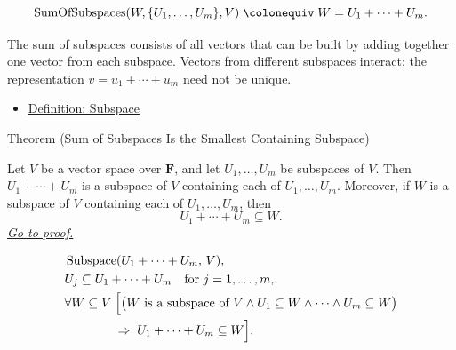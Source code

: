 \begin{remark*}
\[
\operatorname{SumOfSubspaces}(W,\{U_1,\dots,U_m\},V)
\;\colonequiv\;
W=U_1+\cdots+U_m.
\]
\end{remark*}

\begin{remark*}[Interpretation]
The sum of subspaces consists of all vectors that can be built by adding
together one vector from each subspace. Vectors from different subspaces
interact; the representation $v = u_1 + \cdots + u_m$ need not be unique.
\end{remark*}

\begin{remark*}[Dependencies]
\begin{itemize}
  \item \hyperref[def:subspace]{Definition: Subspace}
\end{itemize}
\end{remark*}


\begin{theorembox}{Theorem (Sum of Subspaces Is the Smallest Containing Subspace)}
\begin{theorem}
\label{thm:sum-of-subspaces-smallest-containing}
Let $V$ be a vector space over $\mathbf{F}$, and let
$U_1,\dots,U_m$ be subspaces of $V$.
Then $U_1+\cdots+U_m$ is a subspace of $V$ containing each of
$U_1,\dots,U_m$.
Moreover, if $W$ is a subspace of $V$ containing each of
$U_1,\dots,U_m$, then
\[
U_1+\cdots+U_m \subseteq W.
\]
\hyperref[prf:sum-of-subspaces-smallest-containing]{\textit{Go to proof.}}
\end{theorem}
\end{theorembox}

\begin{remark*}
\[
\begin{aligned}
&\operatorname{Subspace}(U_1+\cdots+U_m,\,V), \\
&U_j \subseteq U_1+\cdots+U_m \quad \text{for } j=1,\dots,m, \\
&\forall W \subseteq V\;
\Bigl[
\bigl(W \text{ is a subspace of } V
\land U_1 \subseteq W \land \cdots \land U_m \subseteq W\bigr) \\
&\qquad\qquad\Rightarrow\;
U_1+\cdots+U_m \subseteq W
\Bigr].
\end{aligned}
\]
\end{remark*}

